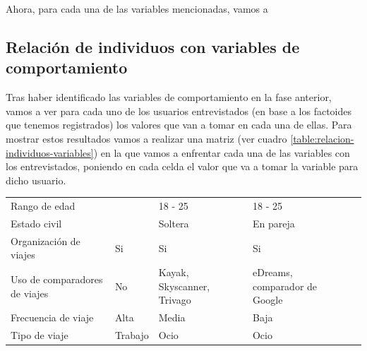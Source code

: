 Ahora, para cada una de las variables mencionadas, vamos a 
\subsection{Relación de individuos con variables de comportamiento}
Tras haber identificado las variables de comportamiento en la fase anterior, vamos a ver para cada uno de los usuarios entrevistados (en base a los factoides
que tenemos registrados) los valores que van a tomar en cada una de ellas. Para mostrar estos resultados vamos a realizar una matriz (ver cuadro \ref{table:relacion-individuos-variables})
en la que vamos a enfrentar cada una de las variables con los entrevistados, poniendo en cada celda el valor que va a tomar la variable para dicho usuario.
\begin{table}[H]
    \centering
    \begin{tabular}{|p{10em}|p{7em}|p{7em}|p{7em}|p{8em}|}
        \hline
        \cellcolor{black}                 & \cellcolor{black}{\textcolor{white}{Madi}}  & \cellcolor{black}{\textcolor{white}{Sofía}}   & \cellcolor{black}{\textcolor{white}{Beatriz}} \\ \hline
        Rango de edad                     &                                             & 18 - 25                                       & 18 - 25                                       \\ \hline
        Estado civil                      &                                             & Soltera                                       & En pareja                                     \\ \hline
        Organización de viajes            & Si                                          & Si                                            & Si                                            \\ \hline
        Uso de comparadores de viajes     & No                                          & Kayak, Skyscanner, Trivago                    & eDreams, comparador de Google                 \\ \hline
        Frecuencia de viaje               & Alta                                        & Media                                         & Baja                                          \\ \hline
        Tipo de viaje                     & Trabajo                                     & Ocio                                          & Ocio                                          \\ \hline

\end{tabular}
\end{table}
